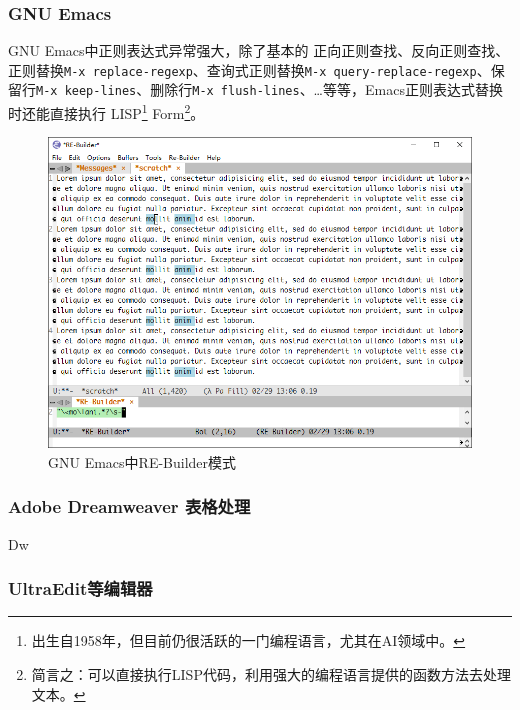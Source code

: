 \documentclass[12pt,a4paper,twoside]{ctexart}
\begin{document}
\subsubsection{GNU Emacs}
\label{sec:emacs}

GNU Emacs中正则表达式异常强大，除了基本的 正向正则查找、反向正则查找、正则替换\texttt{M-x replace-regexp}、查询式正则替换\texttt{M-x query-replace-regexp}、保留行\texttt{M-x keep-lines}、删除行\texttt{M-x flush-lines}、\ldots 等等，Emacs正则表达式替换时还能直接执行 LISP\footnote{出生自1958年，但目前仍很活跃的一门编程语言，尤其在AI领域中。} Form\footnote{简言之：可以直接执行LISP代码，利用强大的编程语言提供的函数方法去处理文本。}。 \par

\begin{figure}[htbp]
  \centering
  \includegraphics{FIG/emacs-re-builder.png}
  \caption{GNU Emacs中RE-Builder模式}
  \label{fig:emacs-re-builder}
\end{figure}

\clearpage{}

\subsubsection{Adobe Dreamweaver 表格处理}
\label{sec:adobe-dw}

Dw

\subsubsection{UltraEdit等编辑器}
\label{sec:ultraedit}
\end{document}
